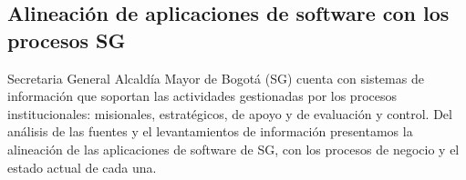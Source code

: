 \documentclass[
	a4paper, %
	12pt, %
]{include/CSSullivanBusinessReport}
\begin{document}
\subsection{Alineación de aplicaciones de software con los procesos
SG}\label{sec:alineaciuxf3n-de-aplicaciones-de-software-con-los-procesos-sg}

\begin{quote}
\end{quote}

Secretaria General Alcaldía Mayor de Bogotá (SG) cuenta con sistemas de
información que soportan las actividades gestionadas por los procesos
institucionales: misionales, estratégicos, de apoyo y de evaluación y
control. Del análisis de las fuentes y el levantamientos de información
presentamos la alineación de las aplicaciones de software de SG, con los
procesos de negocio y el estado actual de cada una.
\end{document}
